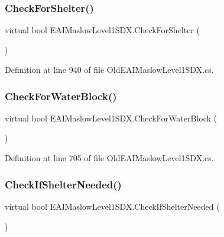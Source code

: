 \subsubsection{\texorpdfstring{CheckForShelter()}{CheckForShelter()}}
{\footnotesize\ttfamily virtual bool E\+A\+I\+Maslow\+Level1\+S\+D\+X.\+Check\+For\+Shelter (\begin{DoxyParamCaption}{ }\end{DoxyParamCaption})\hspace{0.3cm}{\ttfamily [virtual]}}



Definition at line 940 of file Old\+E\+A\+I\+Maslow\+Level1\+S\+D\+X.\+cs.

\mbox{\label{class_e_a_i_maslow_level1_s_d_x_a73ef3c59ba2a9c12f79ecbb96892d85d}} 
\subsubsection{\texorpdfstring{CheckForWaterBlock()}{CheckForWaterBlock()}}
{\footnotesize\ttfamily virtual bool E\+A\+I\+Maslow\+Level1\+S\+D\+X.\+Check\+For\+Water\+Block (\begin{DoxyParamCaption}{ }\end{DoxyParamCaption})\hspace{0.3cm}{\ttfamily [virtual]}}



Definition at line 705 of file Old\+E\+A\+I\+Maslow\+Level1\+S\+D\+X.\+cs.

\mbox{\label{class_e_a_i_maslow_level1_s_d_x_a8d47ef7842d1e77979df321a5ceab691}} 
\subsubsection{\texorpdfstring{CheckIfShelterNeeded()}{CheckIfShelterNeeded()}}
{\footnotesize\ttfamily virtual bool E\+A\+I\+Maslow\+Level1\+S\+D\+X.\+Check\+If\+Shelter\+Needed (\begin{DoxyParamCaption}{ }\end{DoxyParamCaption})\hspace{0.3cm}{\ttfamily [virtual]}}



